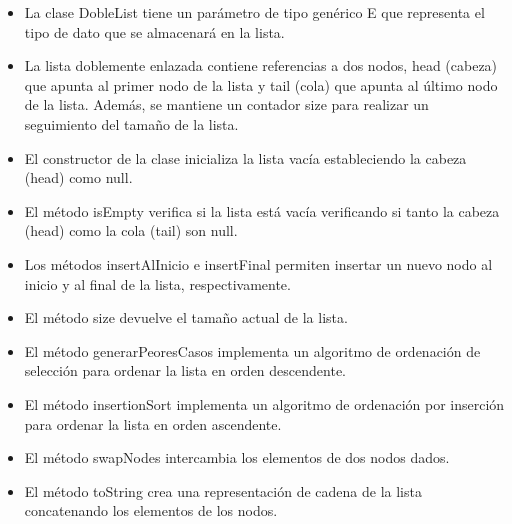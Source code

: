 \documentclass{article}
\begin{document}
	
		
	\begin{itemize}
		\item La clase DobleList tiene un parámetro de tipo genérico E que representa el tipo de dato que se almacenará en la lista.
		\item La lista doblemente enlazada contiene referencias a dos nodos, head (cabeza) que apunta al primer nodo de la lista y tail (cola) que apunta al último nodo de la lista. Además, se mantiene un contador size para realizar un seguimiento del tamaño de la lista.
		\item El constructor de la clase inicializa la lista vacía estableciendo la cabeza (head) como null.
		\item El método isEmpty verifica si la lista está vacía verificando si tanto la cabeza (head) como la cola (tail) son null.
		\item Los métodos insertAlInicio e insertFinal permiten insertar un nuevo nodo al inicio y al final de la lista, respectivamente.
		\item El método size devuelve el tamaño actual de la lista.
		\item El método generarPeoresCasos implementa un algoritmo de ordenación de selección para ordenar la lista en orden descendente.
		\item El método insertionSort implementa un algoritmo de ordenación por inserción para ordenar la lista en orden ascendente.
		\item El método swapNodes intercambia los elementos de dos nodos dados.
		\item El método toString crea una representación de cadena de la lista concatenando los elementos de los nodos.
	\end{itemize}
	
	
	
\end{document}

